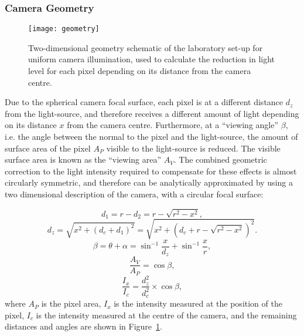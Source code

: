 \subsubsection{Camera Geometry}

\begin{figure}
	\centering
    \texttt{[image: geometry]} 
	\caption[Camera geometry correction schematic]{Two-dimensional geometry schematic of the laboratory set-up for uniform camera illumination, used to calculate the reduction in light level for each pixel depending on its distance from the camera centre.}
	\label{fig:geometry}
\end{figure}



Due to the spherical camera focal surface, each pixel is at a different distance $d_z$ from the light-source, and therefore receives a different amount of light depending on its distance $x$ from the camera centre. Furthermore, at a ``viewing angle'' $\beta$, i.e. the angle between the normal to the pixel and the light-source, the amount of surface area of the pixel $A_P$ visible to the light-source is reduced. The visible surface area is known as the ``viewing area'' $A_V$. The combined geometric correction to the light intensity required to compensate for these effects is almost circularly symmetric, and therefore can be analytically approximated by using a two dimensional description of the camera, with a circular focal surface:

\begin{equation} \label{eq:geom_distance1}
d_1 = r - d_2 = r - \sqrt{r^2 - x^2},
\end{equation}
\begin{equation} \label{eq:geom_distance2}
d_z = \sqrt{x^2 + (d_c + d_1)^2} = \sqrt{x^2 + (d_c + r - \sqrt{r^2 - x^2})^2}.
\end{equation}
\begin{equation} \label{eq:viewing_area1}
\beta = \theta + \alpha = \sin^{-1}{\frac{x}{d_z}} + \sin^{-1}{\frac{x}{r}},
\end{equation}
\begin{equation} \label{eq:viewing_area2}
\frac{A_V}{A_P} = \cos{\beta},
\end{equation}
\begin{equation} \label{eq:geom_correction}
\frac{I_x}{I_c} = \frac{d_z^2}{d_c^2} \times \cos{\beta},
\end{equation}
where $A_P$ is the pixel area, $I_x$ is the intensity measured at the position of the pixel, $I_c$ is the intensity measured at the centre of the camera, and the remaining distances and angles are shown in Figure~\ref{fig:geometry}.

